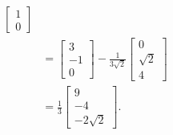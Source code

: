 \documentclass[12 pt, letterpaper]{hmcpset}
\begin{document}
\begin{solution}
\[\begin{split}
\begin{bmatrix}
				1 \\ 
				0
			  \end{bmatrix} \\
				   & = \begin{bmatrix}
				   	3 \\
					-1 \\
					0
				   \end{bmatrix} - \frac{1}{3 \sqrt 2} \begin{bmatrix}
				   	0 \\
					\sqrt 2 \\
					4
				   \end{bmatrix} \\
				   & = \frac{1}{3} \begin{bmatrix}
				   	9 \\
					- 4 \\
					-2 \sqrt 2
				   \end{bmatrix}.
		\end{split}
	\]
\end{solution}
\end{document}
